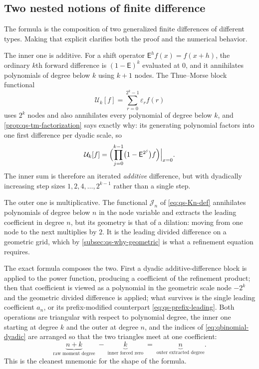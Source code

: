 \documentclass[11pt,oneside]{article}
\theoremstyle{definition}
\theoremstyle{remark}
\begin{document}
\subsection{Two nested notions of finite difference}
\label{subsec:qs-two-differences}

The formula is the composition of two generalized finite differences of different types.
Making that explicit clarifies both the proof and the numerical behavior.

The inner one is additive.  For a shift operator $\mathsf E^hf(x)=f(x+h)$, the ordinary $k$th
forward difference is $(1-\mathsf E)^k$ evaluated at $0$, and it annihilates polynomials of
degree below $k$ using $k+1$ nodes.  The Thue--Morse block functional
\begin{equation}
 \mathcal U_k[f]=\sum_{r=0}^{2^k-1}\varepsilon_rf(r)       \label{eq:qs-P-functional}
\end{equation}
uses $2^k$ nodes and also annihilates every polynomial of degree below $k$, and
\cref{prop:qs-tm-factorization} says exactly why: its generating polynomial factors into one
first difference per dyadic scale, so
\begin{equation}
 \mathcal U_k[f]=\Bigl(\prod_{j=0}^{k-1}\bigl(1-\mathsf E^{2^j}\bigr)f\Bigr)\Big|_{x=0}. \label{eq:qs-P-as-product}
\end{equation}
The inner sum is therefore an iterated \emph{additive} difference, but with dyadically
increasing step sizes $1,2,4,\ldots,2^{k-1}$ rather than a single step.

The outer one is multiplicative.  The functional $\mathcal J_n$ of \eqref{eq:qs-Kn-def}
annihilates polynomials of degree below $n$ in the node variable and extracts the leading
coefficient in degree $n$, but its geometry is that of a dilation: moving from one node to the
next multiplies by $2$.  It is the leading divided difference on a geometric grid, which by
\cref{subsec:qs-why-geometric} is what a refinement equation requires.

The exact formula composes the two.  First a dyadic additive-difference block is applied to
the power function, producing a coefficient of the refinement product; then that coefficient
is viewed as a polynomial in the geometric scale node $-2^k$ and the geometric divided
difference is applied; what survives is the single leading coefficient $a_n$, or its
prefix-modified counterpart \eqref{eq:qs-prefix-leading}.  Both operations are triangular with
respect to polynomial degree, the inner one starting at degree $k$ and the outer at degree
$n$, and the indices of \eqref{eq:qbinomial-dyadic} are arranged so that the two triangles
meet at one coefficient:
\begin{equation}
 \underbrace{n+k}_{\text{raw moment degree}}
 \;-\;\underbrace{k}_{\text{inner forced zero}}
 \;=\;\underbrace{n}_{\text{outer extracted degree}}.      \label{eq:qs-degree-mnemonic}
\end{equation}
This is the cleanest mnemonic for the shape of the formula.
\end{document}
